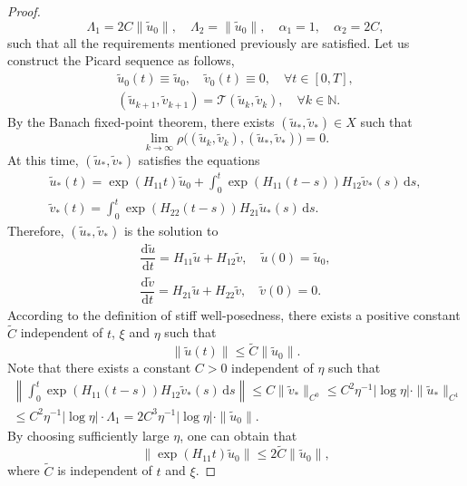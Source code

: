 \documentclass{article}
\theoremstyle{plain}%
\theoremstyle{definition}%
\theoremstyle{remark}%
\newcommand{\bN}{\mathbb{N}}
\newcommand{\cT}{\mathcal{T}}
\newcommand{\rd}{\mathrm{d}}
\newcommand{\+}[1]{{\bm{#1}}}
\newcommand{\norm}[1]{\|{#1}\|}
\newcommand{\nnorm}[1]{\left\|{#1}\right\|}
\newcommand{\od}[2]{\dfrac{\rd{#1}}{\rd{#2}}}
\begin{document}
\begin{proof}
\begin{displaymath}
    \Lambda_1 = 2 C \norm{\tilde{u}_0}, \quad 
    \Lambda_2 = \norm{\tilde{u}_0}, \quad 
    \alpha_1 = 1, \quad \alpha_2 = 2 C,
  \end{displaymath}
  such that all the requirements mentioned previously are satisfied.
  Let us construct the Picard sequence as follows,
  \begin{gather*}
    \tilde{u}_0(t) \equiv \tilde{u}_0, \quad \tilde{v}_0(t) \equiv 0, 
    \quad \forall t \in [0, T], \\
    (\tilde{u}_{k + 1}, \tilde{v}_{k + 1}) = 
    \cT(\tilde{u}_k, \tilde{v}_k), \quad \forall k \in \bN.
  \end{gather*}
  By the Banach fixed-point theorem, there exists 
  $(\tilde{u}_*, \tilde{v}_*) \in X$ such that 
  \begin{displaymath}
    \lim\limits_{k \to \infty}
    \rho \big( (\tilde{u}_k, \tilde{v}_k), 
    (\tilde{u}_*, \tilde{v}_*) \big) = 0.
  \end{displaymath}
  At this time, $(\tilde{u}_*, \tilde{v}_*)$ satisfies the equations
  \begin{gather*}
    \tilde{u}_*(t) = \exp(H_{11} t) \tilde{u}_0 + \int_0^t 
    \exp(H_{11} (t - s)) H_{12} \tilde{v}_*(s) \,\rd s, \\
    \tilde{v}_*(t) = \int_0^t \exp(H_{22} (t - s)) H_{21} 
    \tilde{u}_*(s) \,\rd s.
  \end{gather*}
  Therefore, $(\tilde{u}_*, \tilde{v}_*)$ is the solution to 
  \begin{gather*}
    \od{\tilde{u}}{t}  = H_{11} \tilde{u} + H_{12} \tilde{v}, \quad 
    \tilde{u}(0) = \tilde{u}_0, \\
    \od{\tilde{v}}{t}  = H_{21} \tilde{u} + H_{22} \tilde{v}, \quad 
    \tilde{v}(0) = 0. 
  \end{gather*}
  According to the definition of stiff well-posedness, 
  there exists a positive constant $\tilde{C}$ independent of 
  $t$, $\xi$ and $\eta$ such that 
  \begin{displaymath}
    \| \tilde{u}(t) \| \le \tilde{C} \|\tilde{u}_0\|.
  \end{displaymath}
  Note that there exists a constant $C > 0$ independent of $\eta$ 
  such that  
  \begin{multline*}
    \nnorm{\int_0^t \exp(H_{11} (t - s)) H_{12} \tilde{v}_*(s) 
    \,\rd s}
    \le C \|{\tilde{v}_*}\|_{C^0} 
    \le C^2 \eta^{-1} |\log \eta| \cdot 
    \|\tilde{u}_*\|_{C^1} \\
    \le C^2 \eta^{-1} |\log \eta| \cdot \Lambda_1 
    = 2 C^3 \eta^{-1} |\log \eta| \cdot \|\tilde{u}_0\|.
  \end{multline*}
  By choosing sufficiently large $\eta$, one can obtain that 
  \begin{displaymath}
    \|\exp(H_{11} t) \tilde{u}_0\| \le 2 \tilde{C} \|\tilde{u}_0\|,
  \end{displaymath}
  where $\tilde{C}$ is independent of $t$ and $\xi$.
\end{proof}
\end{document}
